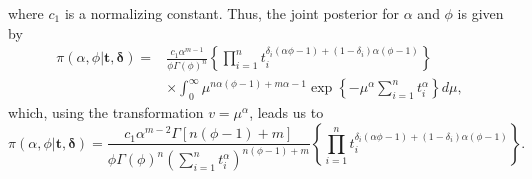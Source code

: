 \documentclass[]{interact}
\newcommand{\bs}{\boldsymbol}
\theoremstyle{plain}%
\theoremstyle{definition}
\theoremstyle{remark}
\begin{document}
where $c_1$ is a normalizing constant. Thus, the joint posterior for $\alpha$ and $\phi$ is given by
\begin{align*}\pi(\alpha,\phi|\bs{t,\delta})
=&\frac{c_1\alpha^{m-1}}{\phi\Gamma(\phi)^n}\left\{\prod_{i=1}^n{t_i^{\delta_i(\alpha\phi-1)+(1-\delta_i)\alpha(\phi-1)}}\right\}\nonumber\\
&\times \int_{0}^\infty \mu^{n\alpha(\phi-1)+m\alpha-1} \exp\left\{-\mu^{\alpha}\sum_{i=1}^n t_i^{\alpha}\right\}d\mu,
\end{align*}
which, using the transformation $v=\mu^{\alpha}$, leads us to
\begin{equation*}%
\pi(\alpha,\phi|\bs{t,\delta})
=\frac{c_1\alpha^{m-2}\Gamma\left[n(\phi-1)+m\right]}{\phi\Gamma(\phi)^n(\sum_{i=1}^n t_i^\alpha)^{n(\phi-1)+m}} \left\{\prod_{i=1}^n{t_i^{\delta_i(\alpha\phi-1)+(1-\delta_i)\alpha(\phi-1)}}\right\}.
\end{equation*}
\end{document}
